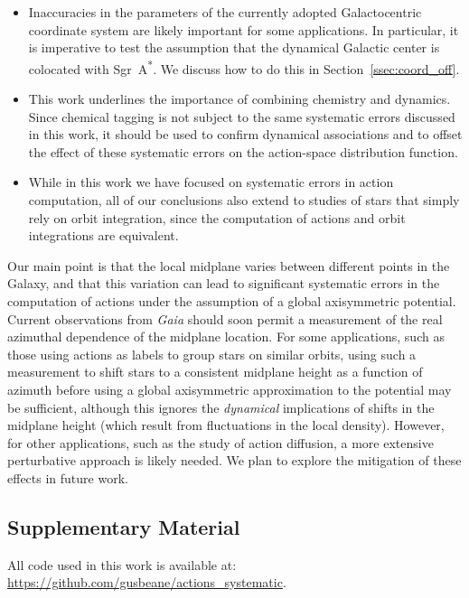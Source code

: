 \documentclass[twocolumn]{aastex62}
\newcommand{\sgra}{Sgr~A\textsuperscript{*}}
\begin{document}
\begin{itemize}
\item Inaccuracies in the parameters of the currently adopted
Galactocentric coordinate system are likely important for some applications.
In particular, it is imperative to test the assumption that the dynamical
Galactic center is colocated with \sgra{}. We discuss how to do this in
Section~\ref{ssec:coord_off}.

\item This work underlines the importance of combining chemistry and dynamics.
Since chemical tagging \citep{2002ARA&A..40..487F} is not subject to the same
systematic errors discussed in this work, it should be used to confirm
dynamical associations and to offset the effect of these systematic errors on
the action-space distribution function.

\item While in this work we have focused on systematic errors in action
computation, all of our conclusions also extend to studies of stars that
simply rely on orbit integration, since the computation of actions and orbit
integrations are equivalent.

\end{itemize}

Our main point is that the local midplane varies between different points in
the Galaxy, and that this variation can lead to significant systematic errors
in the computation of actions under the assumption of a global axisymmetric
potential. Current observations from \textit{Gaia} should soon permit a
measurement of the real azimuthal dependence of the midplane location. For
some applications, such as those using actions as labels to group stars on
similar orbits, using such a measurement to shift stars to a consistent
midplane height as a function of azimuth before using a global axisymmetric
approximation to the potential may be sufficient, although this ignores the
\emph{dynamical} implications of shifts in the midplane height (which result
from fluctuations in the local density). However, for other applications, such
as the study of action diffusion, a more extensive perturbative approach is
likely needed. We plan to explore the mitigation of these effects in future
work.

\subsection*{Supplementary Material}
All code used in this work is available at:
\url{https://github.com/gusbeane/actions_systematic}.
\end{document}
